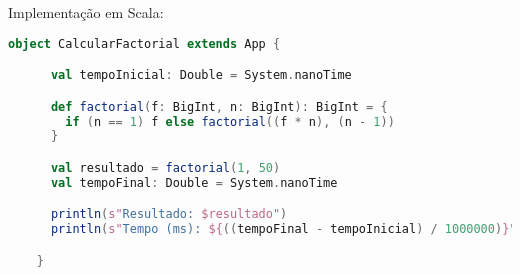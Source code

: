     Implementação em Scala:

    \begin{lstlisting}[language=Scala, mathescape=false]
    object CalcularFactorial extends App {

      val tempoInicial: Double = System.nanoTime

      def factorial(f: BigInt, n: BigInt): BigInt = {
        if (n == 1) f else factorial((f * n), (n - 1))
      }

      val resultado = factorial(1, 50)
      val tempoFinal: Double = System.nanoTime

      println(s"Resultado: $resultado")
      println(s"Tempo (ms): ${((tempoFinal - tempoInicial) / 1000000)}")

    }
    \end{lstlisting}
